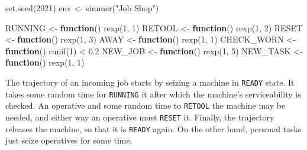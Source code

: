 \documentclass[
]{book}
\newenvironment{Shaded}{\begin{snugshade}}{\end{snugshade}}
\newcommand{\ControlFlowTok}[1]{\textcolor[rgb]{0.13,0.29,0.53}{\textbf{#1}}}
\newcommand{\DecValTok}[1]{\textcolor[rgb]{0.00,0.00,0.81}{#1}}
\newcommand{\FloatTok}[1]{\textcolor[rgb]{0.00,0.00,0.81}{#1}}
\newcommand{\FunctionTok}[1]{\textcolor[rgb]{0.00,0.00,0.00}{#1}}
\newcommand{\NormalTok}[1]{#1}
\newcommand{\OtherTok}[1]{\textcolor[rgb]{0.56,0.35,0.01}{#1}}
\newcommand{\SpecialCharTok}[1]{\textcolor[rgb]{0.00,0.00,0.00}{#1}}
\newcommand{\StringTok}[1]{\textcolor[rgb]{0.31,0.60,0.02}{#1}}
\begin{document}
\begin{Shaded}
\begin{Highlighting}[]
\FunctionTok{set.seed}\NormalTok{(}\DecValTok{2021}\NormalTok{)}
\NormalTok{env }\OtherTok{\textless{}{-}} \FunctionTok{simmer}\NormalTok{(}\StringTok{"Job Shop"}\NormalTok{)}

\NormalTok{RUNNING }\OtherTok{\textless{}{-}} \ControlFlowTok{function}\NormalTok{() }\FunctionTok{rexp}\NormalTok{(}\DecValTok{1}\NormalTok{, }\DecValTok{1}\NormalTok{)}
\NormalTok{RETOOL }\OtherTok{\textless{}{-}} \ControlFlowTok{function}\NormalTok{() }\FunctionTok{rexp}\NormalTok{(}\DecValTok{1}\NormalTok{, }\DecValTok{2}\NormalTok{)}
\NormalTok{RESET }\OtherTok{\textless{}{-}} \ControlFlowTok{function}\NormalTok{() }\FunctionTok{rexp}\NormalTok{(}\DecValTok{1}\NormalTok{, }\DecValTok{3}\NormalTok{)}
\NormalTok{AWAY }\OtherTok{\textless{}{-}} \ControlFlowTok{function}\NormalTok{() }\FunctionTok{rexp}\NormalTok{(}\DecValTok{1}\NormalTok{, }\DecValTok{1}\NormalTok{)}
\NormalTok{CHECK\_WORN }\OtherTok{\textless{}{-}} \ControlFlowTok{function}\NormalTok{() }\FunctionTok{runif}\NormalTok{(}\DecValTok{1}\NormalTok{) }\SpecialCharTok{\textless{}} \FloatTok{0.2}
\NormalTok{NEW\_JOB }\OtherTok{\textless{}{-}} \ControlFlowTok{function}\NormalTok{() }\FunctionTok{rexp}\NormalTok{(}\DecValTok{1}\NormalTok{, }\DecValTok{5}\NormalTok{)}
\NormalTok{NEW\_TASK }\OtherTok{\textless{}{-}} \ControlFlowTok{function}\NormalTok{() }\FunctionTok{rexp}\NormalTok{(}\DecValTok{1}\NormalTok{, }\DecValTok{1}\NormalTok{)}
\end{Highlighting}
\end{Shaded}

The trajectory of an incoming job starts by seizing a machine in \texttt{READY} state. It takes some random time for \texttt{RUNNING} it after which the machine's serviceability is checked. An operative and some random time to \texttt{RETOOL} the machine may be needed, and either way an operative must \texttt{RESET} it. Finally, the trajectory releases the machine, so that it is \texttt{READY} again. On the other hand, personal tasks just seize operatives for some time.
\end{document}
